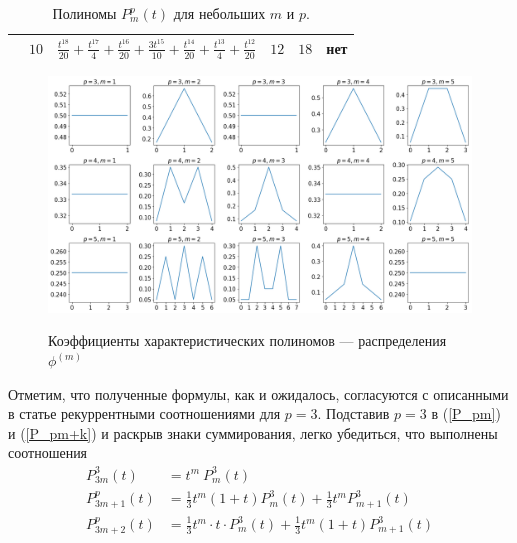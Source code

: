 \documentclass[14pt, a4paper, russian]{report}
\begin{document}
\begin{table}[H]
\begin{small}
\begin{center}
\begin{tabular}{|c|c|c|c|c|c|}
                    & $10$ & $\frac{t^{18}}{20}+\frac{t^{17}}{4}+\frac{t^{16}}{20}+\frac{3 t^{15}}{10}+\frac{t^{14}}{20}+\frac{t^{13}}{4}+\frac{t^{12}}{20}$ & $12$ & $18$ & нет \\
\hline
\end{tabular}
\end{center}
\end{small}
\caption{\label{table:polynomials} Полиномы $P_m^p(t)$ для небольших $m$ и $p$.}
\end{table}

\begin{figure}[H]
{\includegraphics[width=\linewidth]{distributions_with_labels}}
    \caption{\footnotesize{Коэффициенты характеристических полиномов --- распределения $\phi^{(m)}$}}
\label{fig:distributions}
\end{figure}


Отметим, что полученные формулы, как и ожидалось, согласуются с описанными в статье \cite{weaklimits} рекуррентными соотношениями для $p=3$. Подставив $p=3$ в (\ref{P_pm}) и (\ref{P_pm+k}) и раскрыв знаки суммирования, легко убедиться, что выполнены соотношения
\begin{align*}
P_{3m}^3(t) & =  t^{m}\ P_m^3(t) \\
P_{3m+1}^p(t) & =  \frac{1}{3} t^m (1 + t) P_m^3(t)  + \frac{1}{3} t^m P_{m+1}^3(t)\\
P_{3m+2}^p(t) & =  \frac{1}{3} t^m \cdot t\cdot  P_m^3(t)  + \frac{1}{3} t^m (1+t) P_{m+1}^3(t)
\end{align*}
\end{document}
